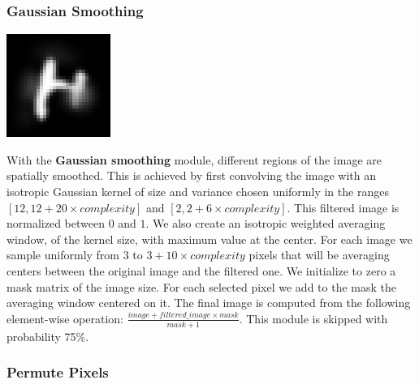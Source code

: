 \documentclass{article} %
\begin{document}
\subsubsection*{Gaussian Smoothing}

\begin{minipage}[t]{0.14\linewidth}
\begin{center}
\vspace*{6mm}
\includegraphics[scale=.4]{images/Bruitgauss_only.png}
\end{center}
\end{minipage}%
\hspace{0.3cm}\begin{minipage}[t]{0.86\linewidth}
With the {\bf Gaussian smoothing} module, 
different regions of the image are spatially smoothed.
This is achieved  by first convolving
the image with an isotropic Gaussian kernel of
size and variance chosen uniformly in the ranges $[12,12 + 20 \times
complexity]$ and $[2,2 + 6 \times complexity]$. This filtered image is normalized
between $0$ and $1$.  We also create an isotropic weighted averaging window, of the
kernel size, with maximum value at the center.  For each image we sample
uniformly from $3$ to $3 + 10 \times complexity$ pixels that will be
averaging centers between the original image and the filtered one.  We
initialize to zero a mask matrix of the image size. For each selected pixel
we add to the mask the averaging window centered on it.  The final image is
computed from the following element-wise operation: $\frac{image + filtered\_image
\times mask}{mask+1}$.
This module is skipped with probability 75\%.
\end{minipage}


\subsubsection*{Permute Pixels}
\end{document}
